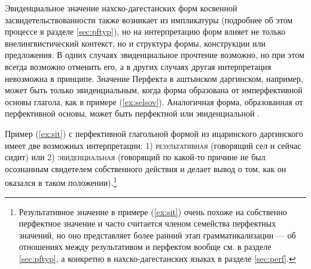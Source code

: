 \par Эвиденциальное значение нахско-дагестанских форм косвенной засвидетельствованности также возникает из импликатуры (подробнее об этом процессе в разделе \ref{sec:pftyp}), но на интерпретацию форм влияет не только внелингвистический контекст, но и структура формы, конструкции или предложения. В одних случаях эвиденциальное прочтение возможно, но при этом всегда возможно отменить его, а в других случаях другая интерпретация невозможна в принципе. \color{black} Значение Перфекта в аштынском даргинском, например, может быть только эвиденциальным, когда форма образована от имперфективной основы глагола, как в примере (\ref{ex:selsov}). Аналогичная форма, образованная от перфективной основы, может быть перфектной или эвиденциальной \citep[202--204]{belyaev2012}.


Пример (\ref{ex:sit}) с перфективной глагольной формой из ицаринского даргинского имеет две возможных интерпретации: 1) \textsc{результативная} (говорящий сел и сейчас сидит) или 2) \textsc{эвиденциальная} (говорящий по какой-то причине не был осознанным свидетелем собственного действия и делает вывод о том, как он оказался в таком положении).\footnote{Результативное значение в примере (\ref{ex:sit}) очень похоже на собственно перфектное значение и часто считается членом семейства перфектных значений, но оно представляет более ранний этап грамматикализации --- об отношениях между результативом и перфектом вообще см. в разделе \ref{sec:pftyp}, а конкретно в нахско-дагестанских языках в разделе \ref{sec:perf}.}



